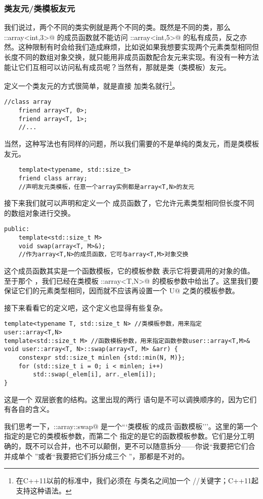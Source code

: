 \subsubsection*{类友元/类模板友元}
我们说过，两个不同的类实例就是两个不同的类。既然是不同的类，那么 \lstinline@user::array<int,3>@ 的成员函数就不能访问 \lstinline@user::array<int,5>@ 的私有成员，反之亦然。这种限制有时会给我们造成麻烦，比如说如果我想要实现两个元素类型相同但长度不同的数组对象交换，就只能用非成员函数配合友元来实现。有没有一种方法能让它们互相可以访问私有成员呢？当然有，那就是类（类模板）友元。\par
定义一个类友元的方式很简单，就是直接 \lstinline@friend@ 加类名就行\footnote{在C++11以前的标准中，我们必须在 \lstinline@friend@ 与类名之间加一个 \lstinline@class@/\lstinline@struct@/\lstinline@union@ 关键字；C++11起支持这种语法。}。
\begin{lstlisting}
//class array
    friend array<T, 0>;
    friend array<T, 1>;
    //...
\end{lstlisting}\par
当然，这种写法也有同样的问题，所以我们需要的不是单纯的类友元，而是类模板友元。
\begin{lstlisting}
    template<typename, std::size_t>
    friend class array;
    //声明友元类模板，任意一个array实例都是array<T,N>的友元
\end{lstlisting}
接下来我们就可以声明和定义一个 \lstinline@swap@ 成员函数了，它允许元素类型相同但长度不同的数组对象进行交换。
\begin{lstlisting}
public:
    template<std::size_t M>
    void swap(array<T, M>&);
    //作为array<T,N>的成员函数，它可与array<T,M>对象交换
\end{lstlisting}
这个成员函数其实是一个函数模板，它的模板参数 \lstinline@M@ 表示它将要调用的对象的值。至于那个 \lstinline@T@，我们已经在类模板 \lstinline@user::array<T,N>@ 的模板参数中给出了。这里我们要保证它们的元素类型相同，因而就不应该再设置一个 \lstinline@typename U@ 之类的模板参数。\par
接下来看看它的定义吧，这个定义也显得有些复杂。
\begin{lstlisting}
template<typename T, std::size_t N> //类模板参数，用来指定user::array<T,N>
template<std::size_t M> //函数模板参数，用来指定函数参数user::array<T,M>&
void user::array<T, N>::swap(array<T, M> &arr) {
    constexpr std::size_t minlen {std::min(N, M)};
    for (std::size_t i = 0; i < minlen; i++)
        std::swap(_elem[i], arr._elem[i]);
}
\end{lstlisting}
这是一个 \lstinline@template@ 双层嵌套的结构。这里出现的两行 \lstinline@template@ 语句是不可以调换顺序的，因为它们有各自的含义。\par
我们思考一下，\lstinline@user::array::swap@ 是一个```类模板'的成员`函数模板'''。这里的第一个 \lstinline@template@ 指定的是它的类模板参数，而第二个 \lstinline@template@ 指定的是它的函数模板参数。它们是分工明确的，既不可以合并，也不可以颠倒，更不可以随意拆分——你说``我要把它们合并成单个 \lstinline@template@''或者``我要把它们拆分成三个 \lstinline@template@''，那都是不对的。\par
